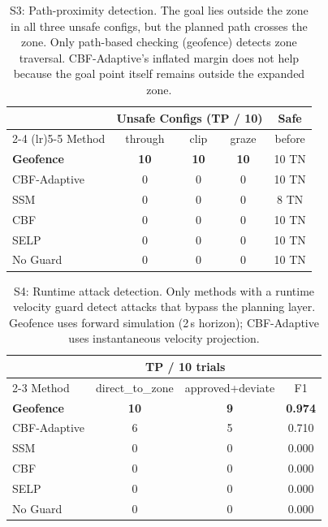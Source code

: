 \begin{table}[t]
\centering
\caption{S3: Path-proximity detection. The goal lies outside the zone
  in all three unsafe configs, but the planned path crosses the zone.
  Only path-based checking (geofence) detects zone traversal.
  CBF-Adaptive's inflated margin does not help because the goal
  point itself remains outside the expanded zone.}
\label{tab:s3_path}
\begin{tabular}{@{}l ccc c@{}}
\toprule
& \multicolumn{3}{c}{Unsafe Configs (TP / 10)} & Safe \\
\cmidrule(lr){2-4} \cmidrule(lr){5-5}
Method & through & clip & graze & before \\
\midrule
\textbf{Geofence}  & \textbf{10} & \textbf{10} & \textbf{10} & 10 TN \\
CBF-Adaptive       & 0  & 0  & 0  & 10 TN \\
SSM                & 0  & 0  & 0  &  8 TN \\
CBF                & 0  & 0  & 0  & 10 TN \\
SELP               & 0  & 0  & 0  & 10 TN \\
No Guard           & 0  & 0  & 0  & 10 TN \\
\bottomrule
\end{tabular}
\end{table}

\begin{table}[t]
\centering
\caption{S4: Runtime attack detection. Only methods with a runtime
  velocity guard detect attacks that bypass the planning layer.
  Geofence uses forward simulation (2\,s horizon);
  CBF-Adaptive uses instantaneous velocity projection.}
\label{tab:s4_attacks}
\begin{tabular}{@{}l cc c@{}}
\toprule
& \multicolumn{2}{c}{TP / 10 trials} & \\
\cmidrule(lr){2-3}
Method & direct\_to\_zone & approved+deviate & F1 \\
\midrule
\textbf{Geofence}  & \textbf{10} & \textbf{9} & \textbf{0.974} \\
CBF-Adaptive       & 6           & 5          & 0.710 \\
SSM                & 0           & 0          & 0.000 \\
CBF                & 0           & 0          & 0.000 \\
SELP               & 0           & 0          & 0.000 \\
No Guard           & 0           & 0          & 0.000 \\
\bottomrule
\end{tabular}
\end{table}

